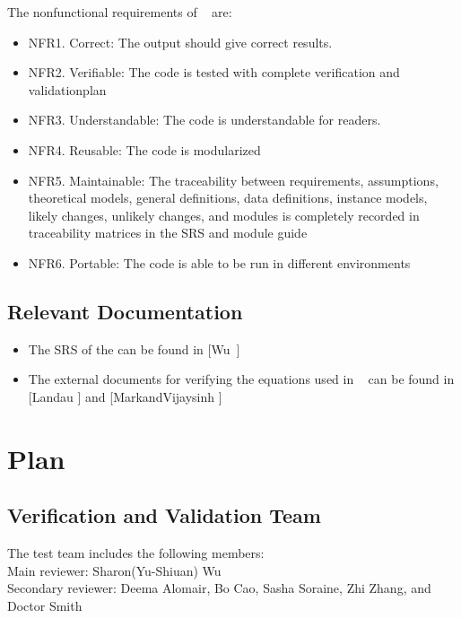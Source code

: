 \documentclass[12pt, titlepage]{article}
\begin{document}
The nonfunctional requirements  of  \progname~ are: 
\begin{itemize} 
\item[ ]NFR1. Correct: The output should give correct results.
\item[ ]NFR2. Verifiable: The code is tested with complete verification and
validationplan
\item[ ]NFR3. Understandable: The code is understandable for readers. 
\item[ ]NFR4. Reusable: The code is modularized
\item[ ]NFR5. Maintainable: The traceability between requirements, assumptions,
theoretical models, general definitions, data definitions, instance models,
likely changes, unlikely changes, and modules is completely recorded in
traceability matrices in the SRS and module guide
\item[ ]NFR6. Portable: The code is able to be run in different environments 
\end{itemize}


\subsection{Relevant Documentation}\label{RD}

\begin{itemize} 
\item[ ]The SRS of the \progname can be found in [Wu~\cite{YS2019}] 
\item[ ]The external documents for verifying the equations used in \progname~
can be found in [Landau \cite{Charles2001} ] and
[MarkandVijaysinh\cite{JacobsonandJadhav} ]

 \end{itemize} 

 \section{Plan}	
\subsection{Verification and Validation Team} The test team includes the
following members:\\ 
Main reviewer: Sharon(Yu-Shiuan) Wu\\ 
Secondary reviewer: Deema Alomair, Bo Cao, Sasha Soraine, Zhi Zhang, 
and Doctor Smith\\
\end{document}

